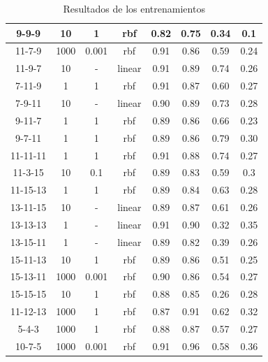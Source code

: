 \begin{table}[H]
\begin{center}
\begin{tabular}{|c|c|c|c|c|c|c|c|}
\multicolumn{1}{|c|}{9-9-9} & 10 & 1 & rbf & 0.82 & 0.75 & 0.34 & 0.1 \\ \hline
\multicolumn{1}{|c|}{11-7-9} & 1000 & 0.001 & rbf & 0.91 & 0.86 & 0.59 & 0.24 \\ \hline
\multicolumn{1}{|c|}{11-9-7} & 10 & - & linear & 0.91 & 0.89 & 0.74 & 0.26 \\ \hline
\multicolumn{1}{|c|}{7-11-9} & 1 & 1 & rbf & 0.91 & 0.87 & 0.60 & 0.27 \\ \hline
\multicolumn{1}{|c|}{7-9-11} & 10 & - & linear & 0.90 & 0.89 & 0.73 & 0.28 \\ \hline
\multicolumn{1}{|c|}{9-11-7} & 1 & 1 & rbf & 0.89 & 0.86 & 0.66 & 0.23 \\ \hline
\multicolumn{1}{|c|}{9-7-11} & 1 & 1 & rbf & 0.89 & 0.86 & 0.79 & 0.30 \\ \hline
\multicolumn{1}{|c|}{11-11-11} & 1 & 1 & rbf & 0.91 & 0.88 & 0.74 & 0.27 \\ \hline
\multicolumn{1}{|c|}{11-3-15} & 10 & 0.1 & rbf & 0.89 & 0.83 & 0.59 & 0.3 \\ \hline
\multicolumn{1}{|c|}{11-15-13} & 1 & 1 & rbf & 0.89 & 0.84 & 0.63 & 0.28 \\ \hline
\multicolumn{1}{|c|}{13-11-15} & 10 & - & linear & 0.89 & 0.87 & 0.61 & 0.26 \\ \hline
\multicolumn{1}{|c|}{13-13-13} & 1 & - & linear & 0.91 & 0.90 & 0.32 & 0.35 \\ \hline
\multicolumn{1}{|c|}{13-15-11} & 1 & - & linear & 0.89 & 0.82 & 0.39 & 0.26 \\ \hline
\multicolumn{1}{|c|}{15-11-13} & 10 & 1 & rbf & 0.89 & 0.86 & 0.51 & 0.25 \\ \hline
\multicolumn{1}{|c|}{15-13-11} & 1000 & 0.001 & rbf & 0.90 & 0.86 & 0.54 & 0.27 \\ \hline
\multicolumn{1}{|c|}{15-15-15} & 10 & 1 & rbf & 0.88 & 0.85 & 0.26 & 0.28 \\ \hline
\multicolumn{1}{|c|}{11-12-13} & 1000 & 1 & rbf & 0.87 & 0.91 & 0.62 & 0.32 \\ \hline
\multicolumn{1}{|c|}{5-4-3} & 1000 & 1 & rbf & 0.88 & 0.87 & 0.57 & 0.27 \\ \hline
\multicolumn{1}{|c|}{10-7-5} & 1000 & 0.001 & rbf & 0.91 & 0.96 & 0.58 & 0.36 \\ \hline
\end{tabular}
\end{center}\caption{Resultados de los entrenamientos}\label{tab:entrenam-result}
\end{table}


